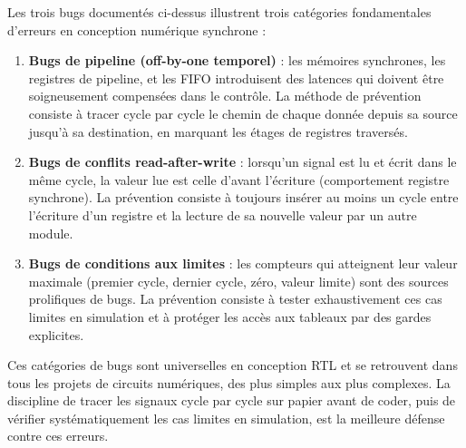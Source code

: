 Les trois bugs documentés ci-dessus illustrent trois catégories fondamentales d'erreurs en conception numérique synchrone :

\begin{enumerate}
    \item \textbf{Bugs de pipeline (off-by-one temporel)} : les mémoires synchrones, les registres de pipeline, et les FIFO introduisent des latences qui doivent être soigneusement compensées dans le contrôle. La méthode de prévention consiste à tracer cycle par cycle le chemin de chaque donnée depuis sa source jusqu'à sa destination, en marquant les étages de registres traversés.

    \item \textbf{Bugs de conflits read-after-write} : lorsqu'un signal est lu et écrit dans le même cycle, la valeur lue est celle d'avant l'écriture (comportement registre synchrone). La prévention consiste à toujours insérer au moins un cycle entre l'écriture d'un registre et la lecture de sa nouvelle valeur par un autre module.

    \item \textbf{Bugs de conditions aux limites} : les compteurs qui atteignent leur valeur maximale (premier cycle, dernier cycle, zéro, valeur limite) sont des sources prolifiques de bugs. La prévention consiste à tester exhaustivement ces cas limites en simulation et à protéger les accès aux tableaux par des gardes explicites.
\end{enumerate}

Ces catégories de bugs sont universelles en conception RTL et se retrouvent dans tous les projets de circuits numériques, des plus simples aux plus complexes. La discipline de tracer les signaux cycle par cycle sur papier avant de coder, puis de vérifier systématiquement les cas limites en simulation, est la meilleure défense contre ces erreurs.

